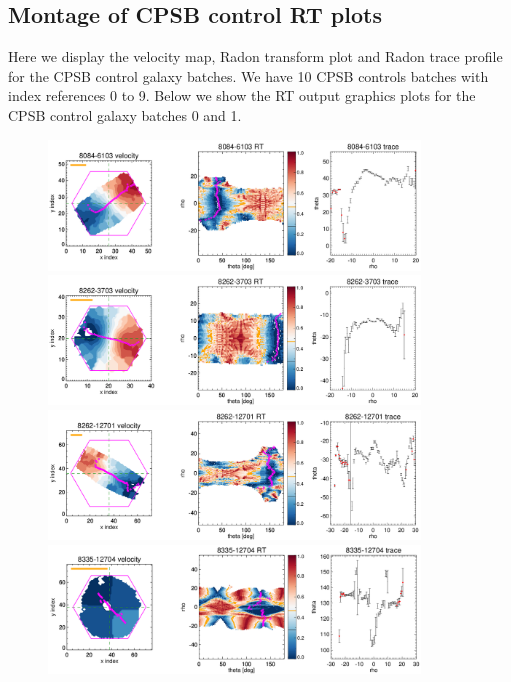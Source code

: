 \documentclass[fleqn,usenatbib]{mnras}
\begin{document}
\subsection{Montage of CPSB control RT plots}
Here we display the velocity map, Radon transform plot and Radon trace profile for the CPSB control galaxy batches. We have 10 CPSB controls batches with index references 0 to 9. Below we show the RT output graphics plots for the CPSB control galaxy batches 0 and 1.

\begin{figure}
    \centering
    \includegraphics[width=0.88\textwidth]{Images/SN1-MC250/CPSB-CTRL-triples/CPSB-CTRL-8084-6103-1-250.png}
    \includegraphics[width=0.88\textwidth]{Images/SN1-MC250/CPSB-CTRL-triples/CPSB-CTRL-8262-3703-1-250.png}
    \includegraphics[width=0.88\textwidth]{Images/SN1-MC250/CPSB-CTRL-triples/CPSB-CTRL-8262-12701-1-250.png}
    \includegraphics[width=0.88\textwidth]{Images/SN1-MC250/CPSB-CTRL-triples/CPSB-CTRL-8335-12704-1-250.png}    

\end{figure}
\end{document}
